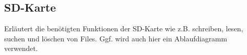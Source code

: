 \subsection{SD-Karte}\label{sec:sdKarte}

Erläutert die benötigten Funktionen der SD-Karte wie z.B. schreiben, lesen, suchen und löschen von Files. Ggf. wird auch hier ein Ablaufdiagramm verwendet.